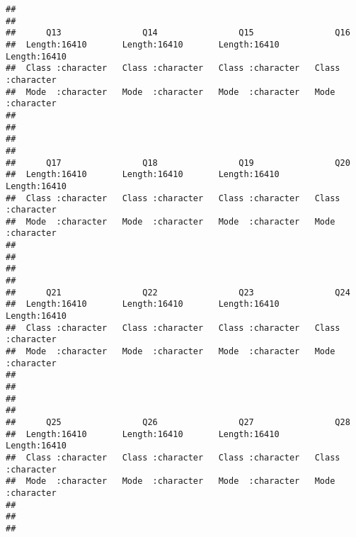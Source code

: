 \documentclass[
]{article}
\begin{document}
\begin{verbatim}
##                                                                             
##                                                                             
##      Q13                Q14                Q15                Q16           
##  Length:16410       Length:16410       Length:16410       Length:16410      
##  Class :character   Class :character   Class :character   Class :character  
##  Mode  :character   Mode  :character   Mode  :character   Mode  :character  
##                                                                             
##                                                                             
##                                                                             
##                                                                             
##      Q17                Q18                Q19                Q20           
##  Length:16410       Length:16410       Length:16410       Length:16410      
##  Class :character   Class :character   Class :character   Class :character  
##  Mode  :character   Mode  :character   Mode  :character   Mode  :character  
##                                                                             
##                                                                             
##                                                                             
##                                                                             
##      Q21                Q22                Q23                Q24           
##  Length:16410       Length:16410       Length:16410       Length:16410      
##  Class :character   Class :character   Class :character   Class :character  
##  Mode  :character   Mode  :character   Mode  :character   Mode  :character  
##                                                                             
##                                                                             
##                                                                             
##                                                                             
##      Q25                Q26                Q27                Q28           
##  Length:16410       Length:16410       Length:16410       Length:16410      
##  Class :character   Class :character   Class :character   Class :character  
##  Mode  :character   Mode  :character   Mode  :character   Mode  :character  
##                                                                             
##                                                                             
##                                                                             

\end{verbatim}
\end{document}
